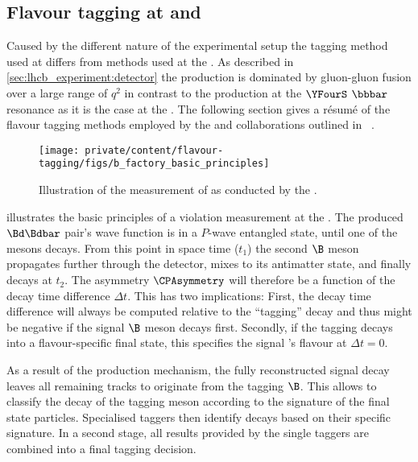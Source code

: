 \subsection*{Flavour tagging at \Babar and \Belle}
\label{sec:flavour_tagging:lhcb:b_factories}

Caused by the different nature of the experimental setup the tagging method used
at \LHCb differs from methods used at the \BFactories. As described in
\cref{sec:lhcb_experiment:detector} the \bhadron production is dominated
by gluon-gluon fusion over a large range of $q^2$ in contrast to the production
at the $\YFourS$ $\bbbar$ resonance as it is the case at the \BFactories. The
following section gives a résumé of the flavour tagging methods employed by the
\Babar and \Belle collaborations outlined in \Ref~\cite[][Ch. 8]{Bevan:2014iga}.
%
\begin{figure}
\centering
\texttt{[image: private/content/flavour-tagging/figs/b\_factory\_basic\_principles]}
\caption{Illustration of the measurement of \sintwobeta as conducted by the
\BFactories. \cite{Bevan:2014iga}
}
\label{fig:flavour_tagging:lhcb:b_factory_basic_principles}
\end{figure}

 illustrates the basic
principles of a \CP violation measurement at the \BFactories. The produced
$\Bd\Bdbar$ pair's wave function is in a $P$-wave entangled state, until one of
the mesons decays. From this point in space time ($t_1$) the second $\B$ meson
propagates further through the detector, mixes to its antimatter state, and
finally decays at $t_2$. The \CP asymmetry $\CPAsymmetry$ will therefore be a
function of the decay time difference $\Delta t$. This has two implications:
First, the decay time difference will always be computed relative to the
\enquote{tagging} \Bmeson decay and thus might be negative if the signal $\B$
meson decays first. Secondly, if the tagging \Bmeson decays into a
flavour-specific final state, this specifies the signal \Bmeson's flavour at
$\Delta t=0$.

As a result of the production mechanism, the fully reconstructed signal decay
leaves all remaining tracks to originate from the tagging $\B$. This allows to
classify the decay of the tagging meson according to the signature of the final
state particles. Specialised taggers then identify decays based on their
specific signature. In a second stage, all results provided by the single
taggers are combined into a final tagging decision. 


